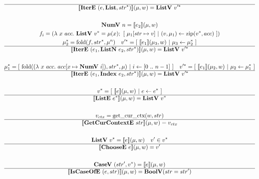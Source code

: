 \begin{gather*}
  \hline
  \sem{\itere ~ (e, \listiter, \seq{str})}(\mu, w) = \listv ~ \seq{v'} \\
%
\newline \\
  \numv ~ n = \sem{e_2}(\mu, w) \\
  f_i =
    (\lambda ~ x ~ acc. ~
      \listv ~ \seq v = \mu(x); ~
      [ ~ \mu_1[str \mapsto v] ~ | ~ (v, \mu_1) \leftarrow \zip (\seq v, acc) ~ ]
    )
  \\
  \seq{\mu_2} = \fold(f, \seq{str}, \mu^n) \quad
  \seq{v'} = [ ~ \sem{e_1}(\mu_3, w) ~ | ~ \mu_3 \leftarrow \seq {\mu_2} ~ ] \\
  \hline
  \sem{\itere ~ (e_1, \listniter ~ e_2, \seq{str})}(\mu, w) = \listv ~ \seq{v'} \\
%
\newline \\
  \seq{\mu_1} =
    [ ~
      \fold(
        (\lambda ~ x ~ acc. ~ acc[x \mapsto \numv ~ i]),
        \seq{str},
        \mu
      )
    ~ | ~
      i \leftarrow [0 ~ .. ~ n-1]
    ~ ]
  \quad
  \seq{v'} = [ ~ \sem{e_1}(\mu_2, w) ~ | ~ \mu_2 \leftarrow \seq {\mu_1} ~ ] \\
  \hline
  \sem{\itere ~ (e_1, \listidxiter ~ e_2, \seq{str})}(\mu, w) = \listv ~ \seq{v'} \\
%
\newline \\
  \seq{v} = [ ~ \sem{e}(\mu, w) ~ | ~ e \leftarrow \seq e ~ ] \\
  \hline
  \sem{\liste ~ \seq{e}}(\mu, w) = \listv ~ \seq{v} \\
%
\newline \\
  v_{ctx} = \getcurctx(w, str) \\
  \hline
  \sem{\getcurctxe ~ str}(\mu, w) = v_{ctx} \\
%
\newline \\
  \listv ~ \seq{v} = \sem{e}(\mu, w) \quad
  v' \in \seq{v} \\
  \hline
  \sem{\choosee ~ e}(\mu, w) = v' \\
%
\newline \\
  \casev ~ (str', \seq{v}) = \sem{e}(\mu, w) \\
  \hline
  \sem{\iscaseofe ~ (e, str)}(\mu, w) = \boolv (str = str') \\
%
\newline \\

\end{gather*}
